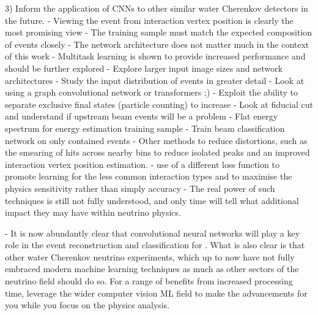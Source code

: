 3) Inform the application of CNNs to other similar water Cherenkov detectors in the future. 
    - Viewing the event from interaction vertex position is clearly the most promising view
    - The training sample must match the expected composition of events closely
    - The network architecture does not matter much in the context of this work
    - Multitask learning is shown to provide increased performance and should be further explored
    - Explore larger input image sizes and network architectures
    - Study the input distribution of events in greater detail
    - Look at using a graph convolutional network or transformers ;)
    - Exploit the ability to separate exclusive final states (particle counting) to increase 
    - Look at fiducial cut and understand if upstream beam events will be a problem
    - Flat energy spectrum for energy estimation training sample
    - Train beam classification network on only contained events
    - Other methods to reduce distortions, such as the smearing of hits across nearby bins to   
    reduce isolated peaks and an improved interaction vertex position estimation.
    - use of a different loss function to promote learning for the less common interaction types 
    and to maximise the physics sensitivity rather than simply accuracy
    - The real power of such techniques is still not fully understood, and only time will tell
    what additional impact they may have within neutrino physics.

- It is now abundantly clear that convolutional neural networks will play a key role in the event
reconstruction and classification for \chips. What is also clear is that other water Cherenkov
neutrino experiments, which up to now have not fully embraced modern machine learning techniques
as much as other sectors of the neutrino field should do so. For a range of benefits from
increased processing time, leverage the wider computer vision ML field to make the advancements
for you while you focus on the physics analysis.